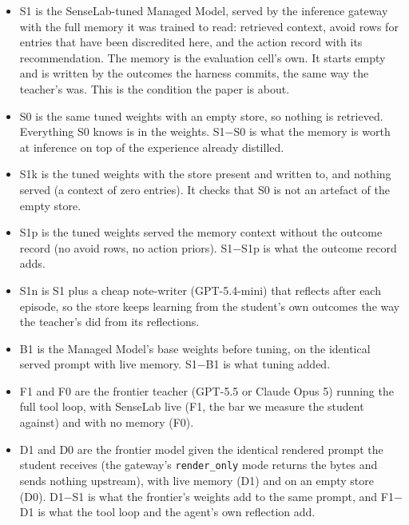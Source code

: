 \documentclass[11pt]{article}
\newcommand{\cond}[1]{\textsf{#1}}
\begin{document}
\begin{itemize}[leftmargin=1.6em, itemsep=0.15em]
\item \cond{S1} is the SenseLab-tuned Managed Model, served by the inference gateway with
  the full memory it was trained to read: retrieved context, avoid rows for entries that
  have been discredited here, and the action record with its recommendation. The memory is
  the evaluation cell's own. It starts empty and is written by the outcomes the harness
  commits, the same way the teacher's was. This is the condition the paper is about.
\item \cond{S0} is the same tuned weights with an empty store, so nothing is retrieved.
  Everything \cond{S0} knows is in the weights. \cond{S1}$-$\cond{S0} is what the memory is
  worth at inference on top of the experience already distilled.
\item \cond{S1k} is the tuned weights with the store present and written to, and nothing
  served (a context of zero entries). It checks that \cond{S0} is not an artefact of the
  empty store.
\item \cond{S1p} is the tuned weights served the memory context without the outcome record
  (no avoid rows, no action priors). \cond{S1}$-$\cond{S1p} is what the outcome record adds.
\item \cond{S1n} is \cond{S1} plus a cheap note-writer (GPT-5.4-mini) that reflects after
  each episode, so the store keeps learning from the student's own outcomes the way the
  teacher's did from its reflections.
\item \cond{B1} is the Managed Model's base weights before tuning, on the identical served
  prompt with live memory. \cond{S1}$-$\cond{B1} is what tuning added.
\item \cond{F1} and \cond{F0} are the frontier teacher (GPT-5.5 or Claude Opus 5) running
  the full tool loop, with SenseLab live (\cond{F1}, the bar we measure the student against)
  and with no memory (\cond{F0}).
\item \cond{D1} and \cond{D0} are the frontier model given the identical rendered prompt the
  student receives (the gateway's \texttt{render\_only} mode returns the bytes and sends
  nothing upstream), with live memory (\cond{D1}) and on an empty store (\cond{D0}).
  \cond{D1}$-$\cond{S1} is what the frontier's weights add to the same prompt, and
  \cond{F1}$-$\cond{D1} is what the tool loop and the agent's own reflection add.
\end{itemize}
\end{document}
